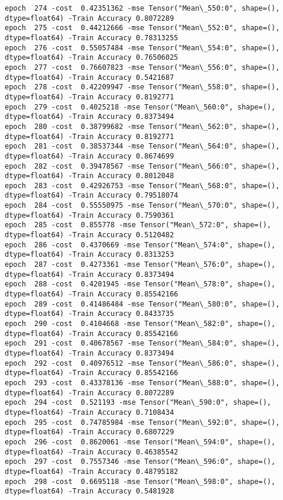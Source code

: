 \documentclass[11pt]{article}
\begin{document}
\begin{Verbatim}[commandchars=\\\{\}]
epoch  274 -cost  0.42351362 -mse Tensor("Mean\_550:0", shape=(), dtype=float64) -Train Accuracy 0.8072289
epoch  275 -cost  0.44212666 -mse Tensor("Mean\_552:0", shape=(), dtype=float64) -Train Accuracy 0.78313255
epoch  276 -cost  0.55057484 -mse Tensor("Mean\_554:0", shape=(), dtype=float64) -Train Accuracy 0.76506025
epoch  277 -cost  0.76607823 -mse Tensor("Mean\_556:0", shape=(), dtype=float64) -Train Accuracy 0.5421687
epoch  278 -cost  0.42209947 -mse Tensor("Mean\_558:0", shape=(), dtype=float64) -Train Accuracy 0.8192771
epoch  279 -cost  0.4025218 -mse Tensor("Mean\_560:0", shape=(), dtype=float64) -Train Accuracy 0.8373494
epoch  280 -cost  0.38799682 -mse Tensor("Mean\_562:0", shape=(), dtype=float64) -Train Accuracy 0.8192771
epoch  281 -cost  0.38537344 -mse Tensor("Mean\_564:0", shape=(), dtype=float64) -Train Accuracy 0.8674699
epoch  282 -cost  0.39478567 -mse Tensor("Mean\_566:0", shape=(), dtype=float64) -Train Accuracy 0.8012048
epoch  283 -cost  0.42926753 -mse Tensor("Mean\_568:0", shape=(), dtype=float64) -Train Accuracy 0.79518074
epoch  284 -cost  0.55550975 -mse Tensor("Mean\_570:0", shape=(), dtype=float64) -Train Accuracy 0.7590361
epoch  285 -cost  0.855778 -mse Tensor("Mean\_572:0", shape=(), dtype=float64) -Train Accuracy 0.5120482
epoch  286 -cost  0.4370669 -mse Tensor("Mean\_574:0", shape=(), dtype=float64) -Train Accuracy 0.8313253
epoch  287 -cost  0.4273361 -mse Tensor("Mean\_576:0", shape=(), dtype=float64) -Train Accuracy 0.8373494
epoch  288 -cost  0.4201945 -mse Tensor("Mean\_578:0", shape=(), dtype=float64) -Train Accuracy 0.85542166
epoch  289 -cost  0.41486484 -mse Tensor("Mean\_580:0", shape=(), dtype=float64) -Train Accuracy 0.8433735
epoch  290 -cost  0.4104668 -mse Tensor("Mean\_582:0", shape=(), dtype=float64) -Train Accuracy 0.85542166
epoch  291 -cost  0.40678567 -mse Tensor("Mean\_584:0", shape=(), dtype=float64) -Train Accuracy 0.8373494
epoch  292 -cost  0.40976512 -mse Tensor("Mean\_586:0", shape=(), dtype=float64) -Train Accuracy 0.85542166
epoch  293 -cost  0.43378136 -mse Tensor("Mean\_588:0", shape=(), dtype=float64) -Train Accuracy 0.8072289
epoch  294 -cost  0.521193 -mse Tensor("Mean\_590:0", shape=(), dtype=float64) -Train Accuracy 0.7108434
epoch  295 -cost  0.74785984 -mse Tensor("Mean\_592:0", shape=(), dtype=float64) -Train Accuracy 0.6807229
epoch  296 -cost  0.8620061 -mse Tensor("Mean\_594:0", shape=(), dtype=float64) -Train Accuracy 0.46385542
epoch  297 -cost  0.7557346 -mse Tensor("Mean\_596:0", shape=(), dtype=float64) -Train Accuracy 0.48795182
epoch  298 -cost  0.6695118 -mse Tensor("Mean\_598:0", shape=(), dtype=float64) -Train Accuracy 0.5481928

\end{Verbatim}
\end{document}
